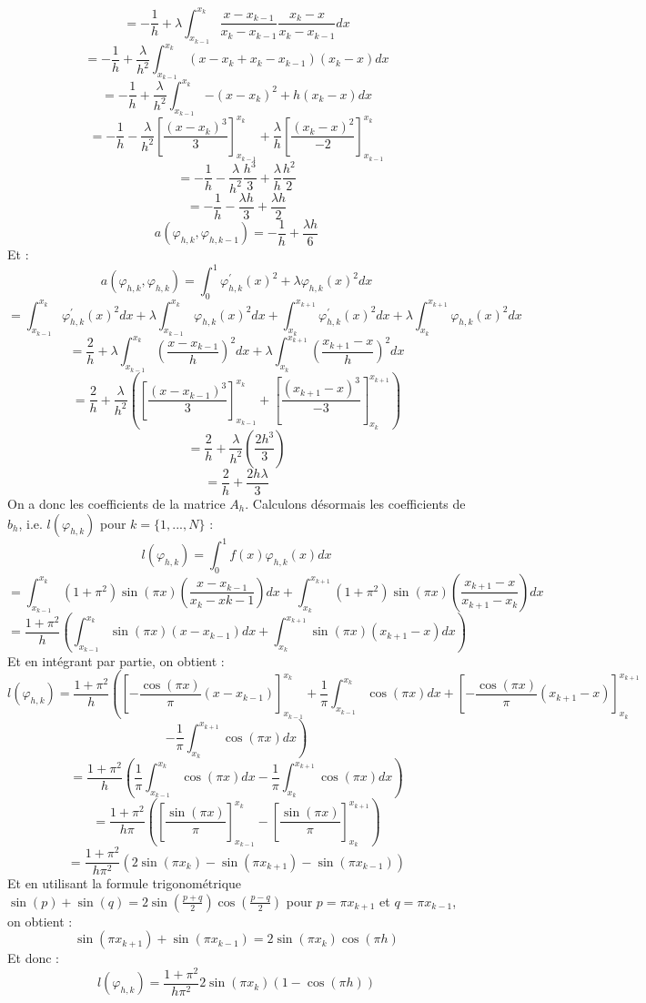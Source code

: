 \documentclass[a4paper,12pt]{article}
\begin{document}
\[=-\frac{1}{h}+\lambda\int_{x_{k-1}}^{x_k} {\frac{x-x_{k-1}}{x_k-x_{k-1}}\frac{x_k-x}{x_k-x_{k-1}} dx}\]
\[=-\frac{1}{h}+\frac{\lambda}{h^2}\int_{x_{k-1}}^{x_k} {(x-x_k+x_k-x_{k-1})(x_k-x) dx}\]
\[=-\frac{1}{h}+\frac{\lambda}{h^2}\int_{x_{k-1}}^{x_k} {-(x-x_k)^{2}+h(x_k-x) dx}\]
\[=-\frac{1}{h}-\frac{\lambda}{h^2}\left[\frac{(x-x_k)^{3}}{3}\right]_{x_{k-1}}^{x_k}+\frac{\lambda}{h}\left[\frac{(x_k-x)^{2}}{-2}\right]_{x_{k-1}}^{x_k}\]
\[=-\frac{1}{h}-\frac{\lambda}{h^2}\frac{h^{3}}{3}+\frac{\lambda}{h}\frac{h^{2}}{2}\]
\[=-\frac{1}{h}-\frac{\lambda h}{3}+\frac{\lambda h}{2}\]
\[a(\varphi_{h,k},\varphi_{h,k-1})=-\frac{1}{h}+\frac{\lambda h}{6}\]
Et :
\[a(\varphi_{h,k},\varphi_{h,k})=\int_{0}^{1} {\varphi_{h,k}^{'}(x)^{2}+\lambda\varphi_{h,k}(x)^{2} dx}\]
\[=\int_{x_{k-1}}^{x_k} {\varphi_{h,k}^{'}(x)^{2} dx}+\lambda\int_{x_{k-1}}^{x_k} {\varphi_{h,k}(x)^{2} dx}+\int_{x_{k}}^{x_{k+1}} {\varphi_{h,k}^{'}(x)^{2} dx}+\lambda\int_{x_{k}}^{x_{k+1}} {\varphi_{h,k}(x)^{2} dx}\]
\[=\frac{2}{h}+\lambda\int_{x_{k-1}}^{x_k} {\left(\frac{x-x_{k-1}}{h}\right)^{2} dx}+\lambda\int_{x_k}^{x_{k+1}} {\left(\frac{x_{k+1}-x}{h}\right)^{2} dx}\]
\[=\frac{2}{h}+\frac{\lambda}{h^2}\left(\left[\frac{(x-x_{k-1})^{3}}{3}\right]_{x_{k-1}}^{x_k}+\left[\frac{(x_{k+1}-x)^{3}}{-3}\right]_{x_{k}}^{x_{k+1}}\right)\]
\[=\frac{2}{h}+\frac{\lambda}{h^2}(\frac{2h^{3}}{3})\]
\[=\frac{2}{h}+\frac{2h\lambda}{3}\]
On a donc les coefficients de la matrice $A_h$. Calculons d\'esormais les coefficients de $b_h$, i.e. $l(\varphi_{h,k})$ pour $k=\{1,...,N\}$ :
\[l(\varphi_{h,k})=\int_{0}^{1}{f(x)\varphi_{h,k}(x) dx}\]
\[=\int_{x_{k-1}}^{x_k}{(1+\pi^{2})\sin(\pi x)\left(\frac{x-x_{k-1}}{x_k-x{k-1}}\right) dx}+\int_{x_k}^{x_{k+1}}{(1+\pi^{2})\sin(\pi x)\left(\frac{x_{k+1}-x}{x_{k+1}-x_k}\right) dx}\]
\[=\frac{1+\pi^2}{h}\left(\int_{x_{k-1}}^{x_k}{\sin(\pi x)(x-x_{k-1}) dx}+\int_{x_k}^{x_{k+1}}{\sin(\pi x)(x_{k+1}-x) dx}\right)\]
Et en int\'egrant par partie, on obtient :
\[l(\varphi_{h,k})=\frac{1+\pi^2}{h}\left(\left[-\frac{\cos(\pi x)}{\pi}(x-x_{k-1})\right]_{x_{k-1}}^{x_k}+\frac{1}{\pi}\int_{x_{k-1}}^{x_k}{\cos(\pi x) dx}+\left[-\frac{\cos(\pi x)}{\pi}(x_{k+1}-x)\right]_{x_{k}}^{x_{k+1}}\right.\]
\[\left. -\frac{1}{\pi}\int_{x_{k}}^{x_{k+1}}{\cos(\pi x) dx}\right)\]
\[=\frac{1+\pi^2}{h}\left(\frac{1}{\pi}\int_{x_{k-1}}^{x_k}{\cos(\pi x) dx}-\frac{1}{\pi}\int_{x_{k}}^{x_{k+1}}{\cos(\pi x) dx}\right)\]
\[=\frac{1+\pi^2}{h\pi}\left(\left[\frac{\sin(\pi x)}{\pi}\right]_{x_{k-1}}^{x_k}-\left[\frac{\sin(\pi x)}{\pi}\right]_{x_k}^{x_{k+1}}\right)\]
\[=\frac{1+\pi^2}{h\pi^2}(2\sin(\pi x_k)-\sin(\pi x_{k+1})-\sin(\pi x_{k-1}))\]
Et en utilisant la formule trigonom\'etrique $\sin(p)+\sin(q)=2\sin(\frac{p+q}{2})\cos(\frac{p-q}{2})$ pour $p=\pi x_{k+1}$ et $q=\pi x_{k-1}$, on obtient :
\[\sin(\pi x_{k+1})+\sin(\pi x_{k-1})=2\sin(\pi x_k)\cos(\pi h)\]
Et donc :
\[l(\varphi_{h,k})=\frac{1+\pi^2}{h\pi^2}2\sin(\pi x_k)(1-\cos(\pi h))\]
\end{document}
